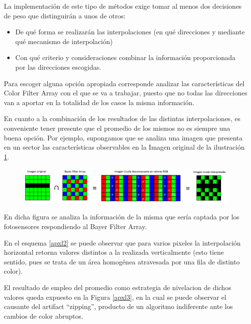 \documentclass[a4paper]{article}
\begin{document}
La implementación de este tipo de métodos exige tomar al menos dos decisiones de peso que distinguirán a unos de otros:\\

\begin{itemize}
    \item De qué forma se realizarán las interpolaciones (en qué direcciones y mediante qué mecanismo de interpolación)
    \item Con qué criterio y consideraciones combinar la información proporcionada por las direcciones escogidas.
\end{itemize}

Para escoger alguna opción apropiada corresponde analizar las características del Color Filter Array con el que se va a trabajar, puesto que no todas las direcciones van a aportar en la totalidad de los casos la misma información.

En cuanto a la combinación de los resultados de las distintas interpolaciones, es conveniente tener presente que el promedio de los mismos no es siempre una buena opción. Por ejemplo, supongamos que se analiza una imagen que presenta en un sector las características observables en la Imagen original de la ilustración \ref{apxl1}.


\begin{figure}[h!]
	\caption{}
	\begin{center}
	\includegraphics[scale=0.23]{imagenes/apxl1}
	\label{apxl1}
  \end{center}
\end{figure}

En dicha figura se analiza la información de la misma que sería captada por los fotosensores respondiendo al Bayer Filter Array. 

En el esquema \ref{apxl2} se puede observar que para varios pixeles la interpolación horizontal retorna valores distintos a la realizada verticalmente (esto tiene sentido, pues se trata de un área homogénea atravesada por una fila de distinto color).

El resultado de empleo del promedio como estrategia de nivelacion de dichos valores queda expuesto en la Figura \ref{apxl3}, en la cual se puede observar el causante del artifact ``zipping'', producto de un algoritmo indiferente ante los cambios de color abruptos.\\
\end{document}
